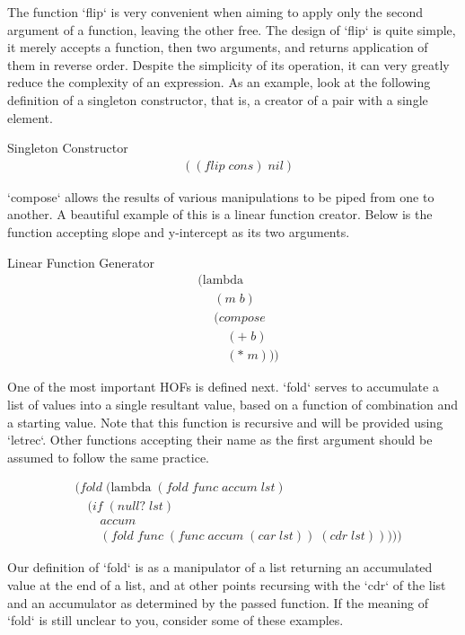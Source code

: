 The function `flip` is very convenient when aiming to apply only the second 
argument of a function, leaving the other free. The design of `flip` is quite 
simple, it merely accepts a function, then two arguments, and returns application 
of them in reverse order. Despite the simplicity of its operation, it can very 
greatly reduce the complexity of an expression. As an example, look at the 
following definition of a singleton constructor, that is, a creator of a pair with 
a single element.

Singleton Constructor
\begin{align*}
& ((flip \; cons) \; nil)
\end{align*}


`compose` allows the results of various manipulations to be piped from one to 
another. A beautiful example of this is a linear function creator. Below is the 
function accepting slope and y-intercept as its two arguments.

Linear Function Generator
\begin{align*}
& (\text{lambda} \; 
\\& \quad \; (m \; b) \; 
\\& \quad \; (compose \; 
\\& \qquad \; (+ \; b) \; 
\\& \qquad \; (* \; m)))
\end{align*}

One of the most important HOFs is defined next. `fold` serves to accumulate a list 
of values into a single resultant value, based on a function of combination and a 
starting value. Note that this function is recursive and will be provided using 
`letrec`. Other functions accepting their name as the first argument should be 
assumed to follow the same practice.

\begin{align*}
& (fold \; (\text{lambda} \; (fold \; func \; accum \; lst)
\\& \quad (if \; (null? \; lst)
\\& \qquad accum
\\& \qquad (fold \; func \; (func \; accum \; (car \; lst)) \; (cdr \; lst)))))
\end{align*}

Our definition of `fold` is as a manipulator of a list returning an accumulated 
value at the end of a list, and at other points recursing with the `cdr` of the 
list and an accumulator as determined by the passed function. If the meaning of 
`fold` is still unclear to you, consider some of these examples.

